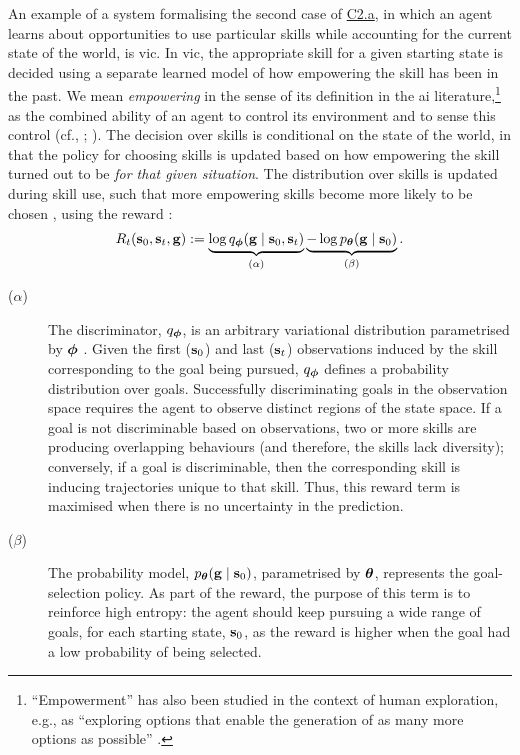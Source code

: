 \documentclass[10pt,letterpaper]{article}
\begin{document}
An example of a system formalising the second case of \hyperref[sec:c2a]{C2.a}, in which an agent learns about opportunities to use particular skills while accounting for the current state of the world, is \gls{vic}. In \gls{vic}, the appropriate skill for a given starting state is decided using a separate learned model of how empowering the skill has been in the past. We mean \emph{empowering} in the sense of its definition in the \gls{ai} literature,\footnote{``Empowerment'' has also been studied in the context of human exploration, e.g., as ``exploring options that enable the generation of as many more options as possible'' \citep[p.~1482]{brandle2023empowerment}.} as the combined ability of an agent to control its environment and to sense this control (cf., \citealp[p.~2]{salge2014empowerment}; \citealp[p.~2]{gregor2016variational}). The decision over skills is conditional on the state of the world, in that the policy for choosing skills is updated based on how empowering the skill turned out to be \emph{for that given situation}. The distribution over skills is updated during skill use, such that more empowering skills become more likely to be chosen \citep[p.~4]{gregor2016variational}, using the reward \citep[p.~2]{gregor2016variational}:
\begin{align}\label{eq:vicreward}
R_t({\mathbf{s}}_0,{\mathbf{s}}_t,{\mathbf{g}}) := \underbrace{\log q_{\boldsymbol{\phi}}({\mathbf{g}} \mid {\mathbf{s}}_0,{\mathbf{s}}_t)}_\text{($\alpha$)} \underbrace{-\log p_{\boldsymbol{\theta}}({\mathbf{g}} \mid {\mathbf{s}}_0)}_\text{($\beta$)}.
\end{align}
\begin{description}
  \item[($\alpha$)] The discriminator, $q_{\boldsymbol{\phi}}$, is an arbitrary variational distribution parametrised by ${\boldsymbol{\phi}}$ \citep[p.~2]{barber2003im}. Given the first (${\mathbf{s}}_0$) and last (${\mathbf{s}}_t$) observations induced by the skill corresponding to the goal being pursued, $q_{\boldsymbol{\phi}}$ defines a probability distribution over goals. Successfully discriminating goals in the observation space requires the agent to observe distinct regions of the state space. If a goal is not discriminable based on observations, two or more skills are producing overlapping behaviours (and therefore, the skills lack diversity); conversely, if a goal is discriminable, then the corresponding skill is inducing trajectories unique to that skill. Thus, this reward term is maximised when there is no uncertainty in the prediction.
  \item[($\beta$)] The probability model, $p_{\boldsymbol{\theta}}({\mathbf{g}} \mid {\mathbf{s}}_0)$, parametrised by ${\boldsymbol{\theta}}$, represents the goal-selection policy. As part of the reward, the purpose of this term is to reinforce high entropy: the agent should keep pursuing a wide range of goals, for each starting state, ${\mathbf{s}}_0$, as the reward is higher when the goal had a low probability of being selected.
\end{description}
\end{document}
